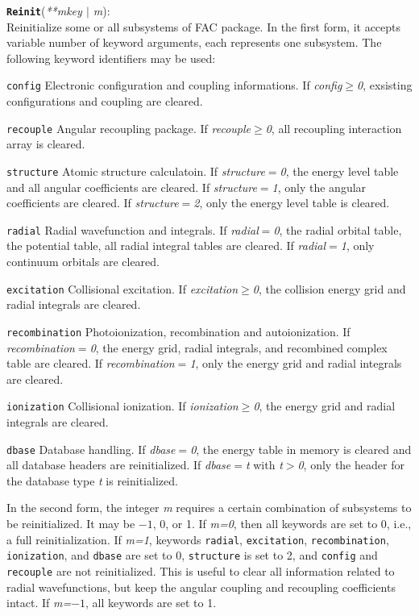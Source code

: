 \documentclass[twoside,letterpaper]{refrep}
\newcommand{\var}[1]{\textit{#1}}
\newcommand{\key}[1]{\texttt{#1}}
\newenvironment{ttscript}[1]{
	\begin{list}{}{
	\settowidth{\labelwidth}{\texttt{#1}}
	\setlength{\leftmargin}{\labelwidth}
	\addtolength{\leftmargin}{\labelsep}
	\setlength{\parsep}{0.5ex plus0.2ex minus0.2ex}
	\setlength{\itemsep}{0.3ex}
	\renewcommand{\makelabel}[1]{\texttt{##1\hfill}}}}
	{\end{list}}
\newenvironment{fundesc}[2]{
	\begin{center}
	\begin{minipage}{\textwidth}
	\index{#1}
	\addcontentsline{toc}{subsubsection}{#1}
	\key{\textbf{#1}}(\var{#2}):\\}
	{\end{minipage}\end{center}}
\begin{document}
\begin{fundesc}{Reinit}{\textnormal{**}mkey $|$ m}
Reinitialize some or all subsystems of FAC package. In the first form, it
accepts variable number of keyword arguments, each represents one
subsystem. The following keyword identifiers may be used:
\begin{ttscript}{recombination}
\item[\key{config}] Electronic configuration and coupling informations. If
\var{config$\ge$0}, exsisting configurations and coupling are cleared.
\item[\key{recouple}] Angular recoupling package. If \var{recouple$\ge$0}, all
recoupling interaction array is cleared.
\item[\key{structure}] Atomic structure calculatoin. If \var{structure$=$0},
the energy level table and all angular coefficients are cleared. If
\var{structure$=$1}, only the angular coefficients are cleared. If
\var{structure$=$2}, only the energy level table is cleared.
\item[\key{radial}] Radial wavefunction and integrals. If \var{radial$=$0}, the
radial orbital table, the potential table, all radial integral tables are
cleared. If \var{radial$=$1}, only continuum orbitals are cleared.
\item[\key{excitation}] Collisional excitation. If \var{excitation$\ge$0}, the
collision energy grid and radial integrals are cleared.
\item[\key{recombination}] Photoionization, recombination and
autoionization. If \var{recombination$=$0}, the energy grid, radial integrals,
and recombined complex table are cleared. If \var{recombination$=$1}, only the
energy grid and radial integrals are cleared.
\item[\key{ionization}] Collisional ionization. If \var{ionization$\ge$0}, the
energy grid and radial integrals are cleared.
\item[\key{dbase}] Database handling. If \var{dbase$=$0}, the energy table in
memory is cleared and all database headers are reinitialized. If
\var{dbase$=$t} with \var{t$>$0}, only the header for the database type
\var{t} is reinitialized.
\end{ttscript}

In the second form, the integer \var{m} requires a certain combination of
subsystems to be reinitialized. It may be $-1$, 0, or 1. If \var{m=0}, then all
keywords are set to 0, i.e., a full reinitialization. If \var{m=1}, keywords
\key{radial}, \key{excitation}, \key{recombination}, \key{ionization}, and
\key{dbase} are set to 0, \key{structure} is set to 2, and \key{config} and
\key{recouple} are not reinitialized. This is useful to clear all information
related to radial wavefunctions, but keep the angular coupling and recoupling
coefficients intact. If \var{m=$-1$}, all keywords are set to 1.
\end{fundesc}
\end{document}
